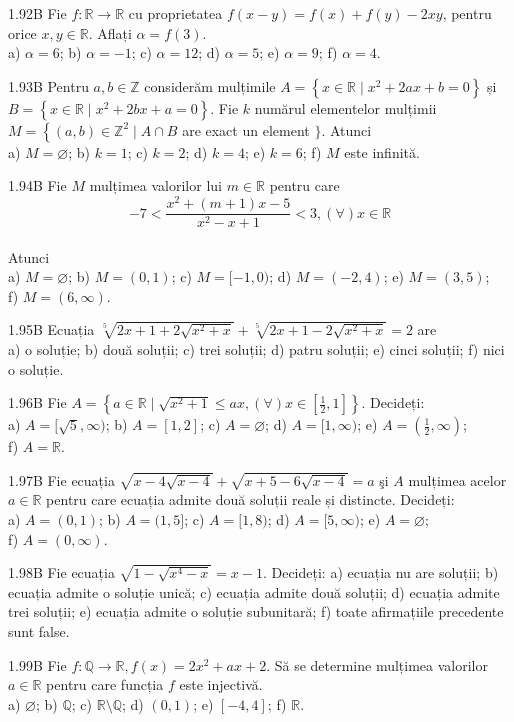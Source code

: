 \documentclass[11pt]{article}
\begin{document}
1.92B Fie $f: \mathbb{R} \rightarrow \mathbb{R}$ cu proprietatea $f(x-y)=f(x)+f(y)-2 x y$, pentru orice $x, y \in \mathbb{R}$. Aflați $\alpha=f(3)$.\\ a) $\alpha=6$; b) $\alpha=-1$; c) $\alpha=12$; d) $\alpha=5$; e) $\alpha=9$; f) $\alpha=4$.

1.93B Pentru $a, b \in \mathbb{Z}$ considerăm mulțimile $A=\left\{x \in \mathbb{R} \mid x^{2}+2 a x+b=0\right\}$ și $B=\left\{x \in \mathbb{R} \mid x^{2}+2 b x+a=0\right\}$. Fie $k$ numărul elementelor mulțimii $M=\left\{(a, b) \in \mathbb{Z}^{2} \mid A \cap B\right.$ are exact un element $\}$. Atunci\\ a) $M=\varnothing$; b) $k=1$; c) $k=2$; d) $k=4$; e) $k=6$; f) $M$ este infinită.

1.94B Fie $M$ mulțimea valorilor lui $m \in \mathbb{R}$ pentru care $$-7<\frac{x^{2}+(m+1) x-5}{x^{2}-x+1}<3,(\forall) x \in \mathbb{R}$$\\ Atunci\\ a) $M=\varnothing$; b) $M=(0,1)$; c) $M=[-1,0)$; d) $M=(-2,4)$; e) $M=(3,5)$;\\ f) $M=(6, \infty)$.

1.95B Ecuația $\sqrt[5]{2 x+1+2 \sqrt{x^{2}+x}}+\sqrt[5]{2 x+1-2 \sqrt{x^{2}+x}}=2$ are\\ a) o soluție; b) două soluții; c) trei soluții; d) patru soluții; e) cinci soluții; f) nici o soluție.

1.96B Fie $A=\left\{a \in \mathbb{R} \mid \sqrt{x^{2}+1} \leq a x,(\forall) x \in\left[\frac{1}{2}, 1\right]\right\}$. Decideți:\\ a) $A=[\sqrt{5}, \infty)$; b) $A=[1,2]$; c) $A=\varnothing$; d) $A=[1, \infty)$; e) $A=\left(\frac{1}{2}, \infty\right)$;\\ f) $A=\mathbb{R}$.

1.97B Fie ecuația $\sqrt{x-4 \sqrt{x-4}}+\sqrt{x+5-6 \sqrt{x-4}}=a$ şi $A$ mulțimea acelor $a \in \mathbb{R}$ pentru care ecuația admite două soluții reale și distincte. Decideți:\\ a) $A=(0,1)$; b) $A=(1,5]$; c) $A=[1,8)$; d) $A=[5, \infty)$; e) $A=\varnothing$;\\ f) $A=(0, \infty)$.

1.98B Fie ecuația $\sqrt{1-\sqrt{x^{4}-x}}=x-1$. Decideți: a) ecuația nu are soluții; b) ecuația admite o soluție unică; c) ecuația admite două soluții; d) ecuația admite trei soluții; e) ecuația admite o soluție subunitară; f) toate afirmațiile precedente sunt false.

1.99B Fie $f: \mathbb{Q} \rightarrow \mathbb{R}, f(x)=2 x^{2}+a x+2$. Să se determine mulțimea valorilor $a \in \mathbb{R}$ pentru care funcția $f$ este injectivă.\\ a) $\varnothing$; b) $\mathbb{Q}$; c) $\mathbb{R} \setminus \mathbb{Q}$; d) $(0,1)$; e) $[-4,4]$; f) $\mathbb{R}$.
\end{document}
